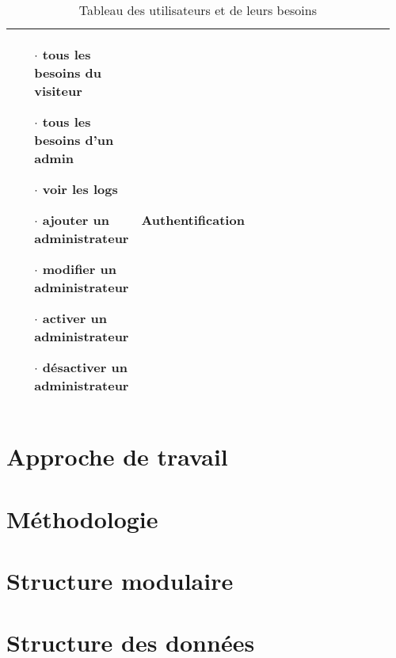 \begin{table}
\begin{tabular}{|p{0.21\linewidth}|p{0.54\linewidth}|p{0.21\linewidth}|}
\begin{itemize}
                                        \item[$\cdot$]  tous les besoins du visiteur
                                        \item[$\cdot$]  tous les besoins d'un admin
                                        \item[$\cdot$]  voir les logs
                                        \item[$\cdot$]  ajouter un administrateur
                                        \item[$\cdot$]  modifier un administrateur
                                        \item[$\cdot$]  activer un administrateur
                                        \item[$\cdot$]  désactiver un administrateur
                                \end{itemize} & 
                                Authentification \\
                        \hline 
                \end{tabular}
                \caption{Tableau des utilisateurs et de leurs besoins} \label{tab:sometab}
        \end{table}
        \par
                \lipsum[1]
        \section{Approche de travail}
                \lipsum[1]
        \section{Méthodologie}
                \lipsum[1]
        \section{Structure modulaire}
                \lipsum[1]
        \section{Structure des données}
                \lipsum[1]
